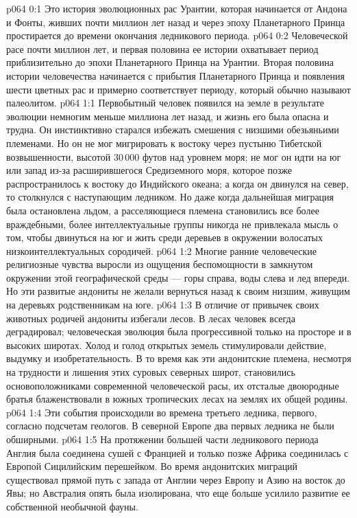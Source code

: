 \author{Носитель Жизни}
\vs p064 0:1 Это история эволюционных рас Урантии, которая начинается от Андона и Фонты, живших почти миллион лет назад и через эпоху Планетарного Принца простирается до времени окончания ледникового периода.
\vs p064 0:2 Человеческой расе почти миллион лет, и первая половина ее истории охватывает период приблизительно до эпохи Планетарного Принца на Урантии. Вторая половина истории человечества начинается с прибытия Планетарного Принца и появления шести цветных рас и примерно соответствует периоду, который обычно называют палеолитом.
\vs p064 1:1 Первобытный человек появился на земле в результате эволюции немногим меньше миллиона лет назад, и жизнь его была опасна и трудна. Он инстинктивно старался избежать смешения с низшими обезьяньими племенами. Но он не мог мигрировать к востоку через пустыню Тибетской возвышенности, высотой 30\,000 футов над уровнем моря; не мог он идти на юг или запад из\hyp{}за расширившегося Средиземного моря, которое позже распространилось к востоку до Индийского океана; а когда он двинулся на север, то столкнулся с наступающим ледником. Но даже когда дальнейшая миграция была остановлена льдом, а расселяющиеся племена становились все более враждебными, более интеллектуальные группы никогда не привлекала мысль о том, чтобы двинуться на юг и жить среди деревьев в окружении волосатых низкоинтеллектуальных сородичей.
\vs p064 1:2 Многие ранние человеческие религиозные чувства выросли из ощущения беспомощности в замкнутом окружении этой географической среды --- горы справа, воды слева и лед впереди. Но эти развитые андониты не желали вернуться назад к своим низшим, живущим на деревьях родственникам на юге.
\vs p064 1:3 В отличие от привычек своих животных родичей андониты избегали лесов. В лесах человек всегда деградировал; человеческая эволюция была прогрессивной только на просторе и в высоких широтах. Холод и голод открытых земель стимулировали действие, выдумку и изобретательность. В то время как эти андонитские племена, несмотря на трудности и лишения этих суровых северных широт, становились основоположниками современной человеческой расы, их отсталые двоюродные братья блаженствовали в южных тропических лесах на землях их общей родины.
\vs p064 1:4 \pc Эти события происходили во времена третьего ледника, первого, согласно подсчетам геологов. В северной Европе два первых ледника не были обширными.
\vs p064 1:5 На протяжении большей части ледникового периода Англия была соединена сушей с Францией и только позже Африка соединилась с Европой Сицилийским перешейком. Во время андонитских миграций существовал прямой путь с запада от Англии через Европу и Азию на восток до Явы; но Австралия опять была изолирована, что еще больше усилило развитие ее собственной необычной фауны.

